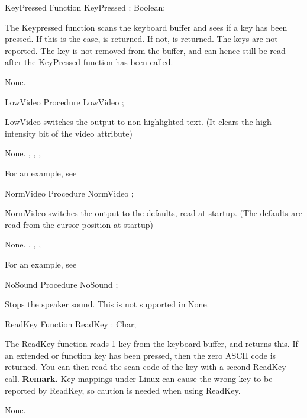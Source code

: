  \html{}
\begin{function}{KeyPressed}
\Declaration
Function KeyPressed  : Boolean;

\Description
 The Keypressed function scans the keyboard buffer and sees if a key has
been pressed. If this is the case,  is returned. If not,
 is returned. The  keys are not reported.
The key is not removed from the buffer, and can hence still be read after
the KeyPressed function has been called.

\Errors
None.
\SeeAlso
{}
\end{function}
 \html{}
\begin{procedure}{LowVideo}
\Declaration
Procedure LowVideo ;

\Description
 LowVideo switches the output to non-highlighted text. (It clears the high
intensity bit of the video attribute)

\Errors
None.
\SeeAlso
 , , ,
\end{procedure}
For an example, see 
\begin{procedure}{NormVideo}
\Declaration
Procedure NormVideo ;

\Description
 NormVideo switches the output to the defaults, read at startup. (The
defaults are read from the cursor position at startup)

\Errors
None.
\SeeAlso
 , , ,
\end{procedure}
For an example, see 
\begin{procedure}{NoSound}
\Declaration
Procedure NoSound ;

\Description

Stops the speaker sound.
This is not supported in \linux
\Errors
None.
\SeeAlso
{}
\end{procedure}
 \html{}
\begin{function}{ReadKey}
\Declaration
Function ReadKey  : Char;

\Description

The ReadKey function reads 1 key from the keyboard buffer, and returns this.
If an extended or function key has been pressed, then the zero ASCII code is 
returned. You can then read the scan code of the key with a second ReadKey
call.
\textbf{Remark.} Key mappings under Linux can cause the wrong key to be
reported by ReadKey, so caution is needed when using ReadKey.  

\Errors
None.
\SeeAlso
{}
\end{function}
